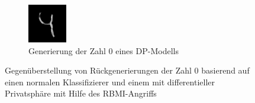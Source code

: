 \begin{figure}[H]
\begin{subfigure}[b]{0.35\linewidth}
		\includegraphics[width=\linewidth]{Bilder/0_rbmi_dp.png}
		\caption{Generierung der Zahl 0 eines DP-Modells}
		\label{img:rbmi_0_dp}
	\end{subfigure}
	\caption{Gegenüberstellung von Rückgenerierungen der Zahl 0 basierend auf einen normalen Klassifizierer und einem mit differentieller Privatsphäre mit Hilfe des \glqq RBMI\grqq-Angriffs}
	\label{img:rbmi_dpvsnorm}
\end{figure}

\begin{table}[h]
	\centering
	\renewcommand{\arraystretch}{1.5}
	\caption{Auswertung verschiedener Angriffszenarios auf \glqq geschützte\grqq{} Modelle}
	\label{tab:dp_stats}
\end{table}


